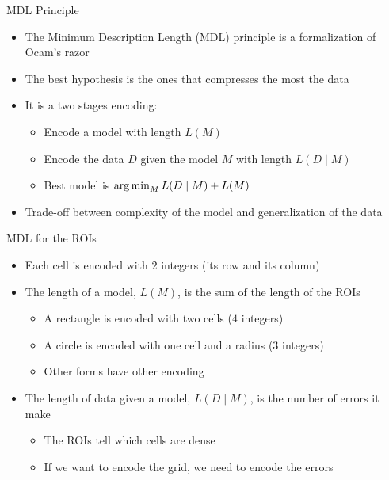\documentclass[10pt]{beamer}
\begin{document}
\begin{frame}{MDL Principle}
    \begin{itemize}
        \item The Minimum Description Length (MDL) principle is a formalization of Ocam's razor
        \item The best hypothesis is the ones that compresses the most the data
        \item It is a two stages encoding:
            \begin{itemize}
                \item Encode a model with length $L(M)$
                \item Encode the data $D$ given the model $M$ with length $L(D \mid M)$
                \item Best model is $\operatorname*{arg\,min}_{M} L(D \mid M) + L(M)$
            \end{itemize}
        \item Trade-off between complexity of the model and generalization of the data
    \end{itemize}
\end{frame}

\begin{frame}{MDL for the ROIs}
    \begin{itemize}
        \item Each cell is encoded with $2$ integers (its row and its column)
        \item The length of a model, $L(M)$, is the sum of the length of the ROIs
            \begin{itemize}
                \item A rectangle is encoded with two cells ($4$ integers)
                \item A circle is encoded with one cell and a radius ($3$ integers)
                \item Other forms have other encoding
            \end{itemize}
        \item The length of data given a model, $L(D \mid M)$, is the number of errors it make
            \begin{itemize}
                \item The ROIs tell which cells are dense
                \item If we want to encode the grid, we need to encode the errors
            \end{itemize}
    \end{itemize}
\end{frame}
\end{document}

